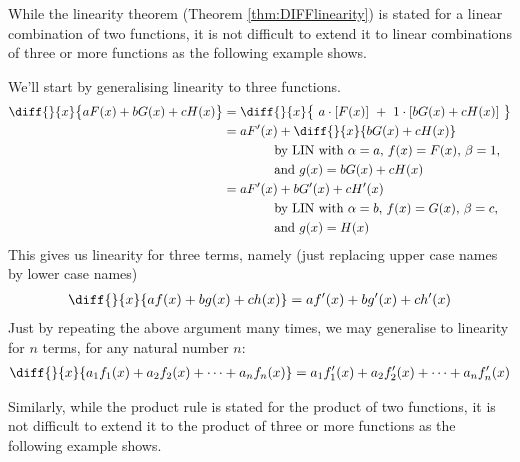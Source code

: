 While the linearity theorem (Theorem \ref{thm:DIFFlinearity}) is stated
for a linear combination of two functions, it is not difficult to extend it
to linear combinations of three or more functions as the following
example shows.

\begin{eg}\label{eg:DIFFsimpleToolsB}
We'll start by generalising linearity to three functions.
\begin{align*}
\diff{}{x}\big\{a F(x)+ b G(x)+ c H(x)\big\}
 &=\diff{}{x}\big\{\ a \cdot [F(x)]\ +\ 1\cdot[b G(x)+c H(x)]\ \big\} \\
   &=a F'(x)+\diff{}{x}\{b G(x)+c H(x)\} \\
   &\qquad\qquad\text{by \lin\ with $\alpha=a$, $f(x)=F(x)$, $\beta=1$,} \\
   &\qquad\qquad\text{and $g(x)=b G(x)+c H(x)$} \\
   &=a F'(x)+b G'(x)+c H'(x) \\
   &\qquad\qquad\text{by \lin\ with $\alpha=b $, $f(x)=G(x)$, $\beta=c$,} \\
   &\qquad\qquad\text{and $g(x)=H(x)$}
\end{align*}
This gives us linearity for three terms, namely (just replacing
upper case names by lower case names)
\begin{align*}
\diff{}{x}\{af(x)+bg(x)+ch(x)\} =af'(x)+bg'(x)+ch'(x)
\end{align*}
Just by repeating the above argument many
times, we may generalise to linearity for $n$ terms, for any natural number $n$:
\begin{align*}
\diff{}{x}\{a_1f_1(x)+a_2f_2(x)+\cdots+a_n f_n(x)\}
=a_1f'_1(x)+a_2f'_2(x)+\cdots+a_n f'_n(x)
\end{align*}
\end{eg}

Similarly, while the product rule is stated for the product of
two functions, it is not difficult to extend it to the product of
three or more functions as the following example shows.

